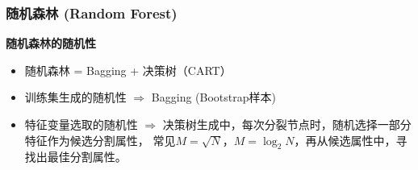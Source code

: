 \documentclass[10pt,aspectratio=43,mathserif]{beamer}
\begin{document}
        \begin{frame}
            \frametitle{\textbf{随机森林 (Random Forest)}}
            \begin{block}{\textbf{随机森林的随机性}}
                \begin{itemize}
                  \item 随机森林 = Bagging + 决策树（CART）
                  \item 训练集生成的随机性 $\Rightarrow$ Bagging (Bootstrap样本)
                  \item 特征变量选取的随机性 $\Rightarrow$ 决策树生成中，每次分裂节点时，随机选择一部分特征作为候选分割属性，
                    常见$M=\sqrt{N}$，$M=\log _2{N}$，再从候选属性中，寻找出最佳分割属性。
                \end{itemize}
            \end{block}
        \end{frame}
\end{document}
